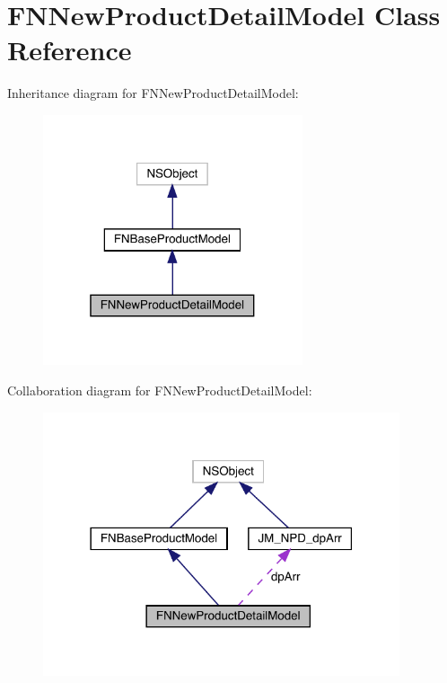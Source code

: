 \hypertarget{interface_f_n_new_product_detail_model}{}\section{F\+N\+New\+Product\+Detail\+Model Class Reference}
\label{interface_f_n_new_product_detail_model}


Inheritance diagram for F\+N\+New\+Product\+Detail\+Model\+:\nopagebreak
\begin{figure}[H]
\begin{center}
\leavevmode
\includegraphics[width=217pt]{interface_f_n_new_product_detail_model__inherit__graph}
\end{center}
\end{figure}


Collaboration diagram for F\+N\+New\+Product\+Detail\+Model\+:\nopagebreak
\begin{figure}[H]
\begin{center}
\leavevmode
\includegraphics[width=298pt]{interface_f_n_new_product_detail_model__coll__graph}
\end{center}
\end{figure}
